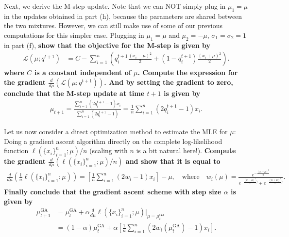 \documentclass[preview]{standalone}
\begin{document}
\begin{Parts}
\Part Next, we derive the M-step update. Note that we can NOT simply plug in $\mu_1 = \mu$
in the updates obtained in part (h), because the parameters are shared between the two mixtures.
However, we can still make use of some of our previous computations for this simpler case.
Plugging in $\mu_1 = \mu$ and $\mu_2=-\mu$, $\sigma_1=\sigma_2=1$ in part (f),
{\bf show that the objective for the M-step is given by
\begin{align*}
  \mathcal{L}(\mu; q^{t+1}) 
  &=  C- \sum_{i=1}^n\left(q^{t+1}_i \frac{(x_i-\mu)^2}{2} + (1-q_i^{t+1}) \frac{(x_i+\mu)^2}{2}\right).
\end{align*}
where $C$ is a constant independent of $\mu$.
Compute the expression for the gradient $\frac{d}{d\mu}(\mathcal{L}(\mu; q^{t+1}))$.
And by setting the gradient to zero, conclude that the M-step update at time $t+1$ is given by
\begin{align*}
  \mu_{t+1} = \frac{\sum_{i=1}^n (2q_i^{t+1}-1)x_i}{\sum_{i=1}^n (2q_i^{t+1}-1)} = \frac{1}{n}\sum_{i=1}^n (2q_i^{t+1}-1)x_i.
\end{align*}
}

\Part Let us now consider a direct optimization method to estimate the
MLE for $\mu$: Doing a gradient ascent 
algorithm directly on the complete log-likelihood function $\ell(\{x_i\}_{i=1}^n; \mu)/n$ (scaling with
$n$ is a bit natural here!).
{\bf Compute the gradient $\frac{d}{d\mu}(\ell(\{x_i\}_{i=1}^n; \mu)/n)$ and show that it is equal to
\begin{align*}
  \frac{d}{d\mu} \left(\frac{1}{n}\ell(\{x_i\}_{i=1}^n; \mu)\right) 
  = \left[\frac{1}{n} \sum_{i=1}^n (2w_i-1)x_i\right] - \mu,
  \quad\text{where}\quad
  w_i(\mu) = \frac{e^{-\frac{(x_i-\mu)^2}{2}}}{e^{-\frac{(x_i-\mu)^2}{2})}+e^{-\frac{(x_i+\mu)^2}{2})}}.
\end{align*}
Finally conclude that the gradient ascent scheme with step size $\alpha$ is given by
\begin{align*}
  \mu_{t+1}^{\text{GA}} &= \mu_{t}^{\text{GA}} + \alpha \frac{d}{d\mu} \ell(\{x_i\}_{i=1}^n; \mu)\bigg\vert_{\mu=\mu_{t}^{\text{GA}}}\\
  &= (1-\alpha)\mu_t^{\text{GA}} + \alpha  \left[\frac{1}{n} \sum_{i=1}^n (2w_i(\mu_t^{\text{GA}})-1)x_i\right].
\end{align*}
}


\end{Parts}
\end{document}

